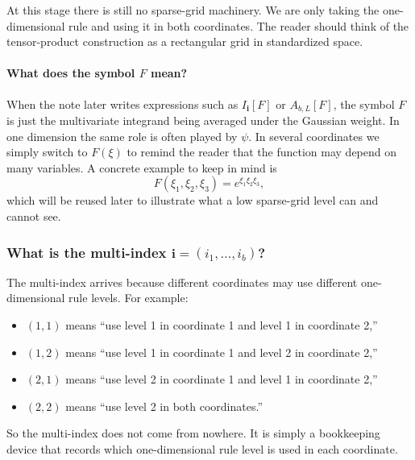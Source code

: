 \documentclass[11pt]{article}
\numberwithin{equation}{section}
\begin{document}
At this stage there is still no sparse-grid machinery.  We are only taking the
one-dimensional rule and using it in both coordinates.  The reader should think
of the tensor-product construction as a rectangular grid in standardized space.

\paragraph{What does the symbol \texorpdfstring{$F$}{F} mean?}
When the note later writes expressions such as \(I_{\mathbf i}[F]\) or
\(A_{b,L}[F]\), the symbol \(F\) is just the multivariate integrand being
averaged under the Gaussian weight.  In one dimension the same role is often
played by \(\psi\).  In several coordinates we simply switch to \(F(\xi)\)
to remind the reader that the function may depend on many variables.  A concrete
example to keep in mind is
\[
  F(\xi_1,\xi_2,\xi_3)=e^{\xi_1\xi_2\xi_3},
\]
which will be reused later to illustrate what a low sparse-grid level can and
cannot see.

\subsubsection{What is the multi-index \texorpdfstring{\(\mathbf i=(i_1,\ldots,i_b)\)}{i=(i1,...,ib)}?}

The multi-index arrives because different coordinates may use different
one-dimensional rule levels.  For example:
\begin{itemize}[leftmargin=0.28in]
  \item \((1,1)\) means ``use level 1 in coordinate 1 and level 1 in coordinate
  2,''
  \item \((1,2)\) means ``use level 1 in coordinate 1 and level 2 in coordinate
  2,''
  \item \((2,1)\) means ``use level 2 in coordinate 1 and level 1 in coordinate
  2,''
  \item \((2,2)\) means ``use level 2 in both coordinates.''
\end{itemize}
So the multi-index does not come from nowhere.  It is simply a bookkeeping device
that records which one-dimensional rule level is used in each coordinate.
\end{document}
